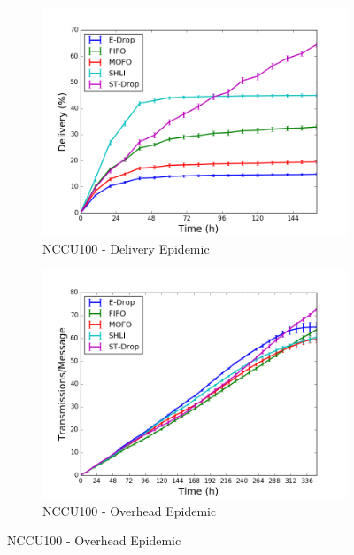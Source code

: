 \begin{figure}
    \begin{subfigure}[b]{0.5\columnwidth}
        \includegraphics[width=\linewidth]{imgs/nccu/100/Epidemic-delivery.png}
        \caption{NCCU100 - Delivery Epidemic}
        \label{fig:nccu100EpidemicDel}
    \end{subfigure}
    \hfill %
    \begin{subfigure}[b]{0.5\columnwidth}
        \includegraphics[width=\linewidth]{imgs/nccu/100/Epidemic-overhead.png}
        \caption{NCCU100 - Overhead Epidemic}
        \label{fig:nccu100EpidemicOver}
    \end{subfigure}


\end{figure}
